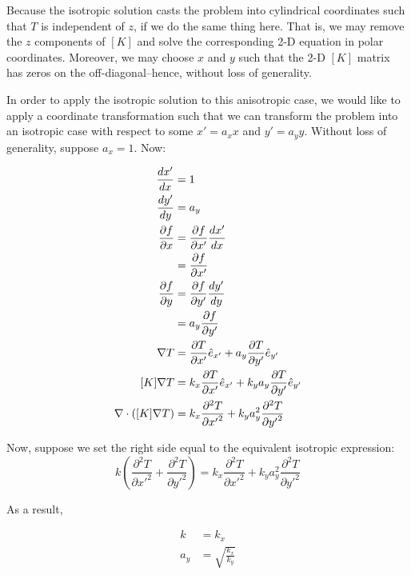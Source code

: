 \documentclass[10pt, letterpaper]{article}
\begin{document}
Because the isotropic solution casts the problem into cylindrical coordinates such that \(T\) is independent of \(z\), if we do the same thing here. That is, we may remove the \(z\) components of \([K]\) and solve the corresponding 2-D equation in polar coordinates. Moreover, we may choose \(x\) and \(y\) such that the 2-D \([K]\) matrix has zeros on the off-diagonal--hence, without loss of generality.

In order to apply the isotropic solution to this anisotropic case, we would like to apply a coordinate transformation such that we can transform the problem into an isotropic case with respect to some \(x' = a_x x\) and \(y' = a_y y\). Without loss of generality, suppose \(a_x = 1\). Now:

\begin{align*}
\frac{dx'}{dx} &= 1\\
\frac{dy'}{dy} &= a_y\\
\frac{\partial f}{\partial x} &= \frac{\partial f}{\partial x'}\frac{dx'}{dx}\\
    &= \frac{\partial f}{\partial x'}\\
\frac{\partial f}{\partial y} &= \frac{\partial f}{\partial y'}\frac{dy'}{dy}\\
    &= a_y\frac{\partial f}{\partial y'}\\
\nabla T &= \frac{\partial T}{\partial x'} \hat{e}_{x'} + a_y\frac{\partial T}{\partial y'} \hat{e}_{y'} \\
[K]\nabla T &= k_x\frac{\partial T}{\partial x'} \hat{e}_{x'} + k_ya_y\frac{\partial T}{\partial y'} \hat{e}_{y'}\\
\nabla \cdot \left([K]\nabla T\right) &= k_x\frac{\partial^2 T}{\partial {x'}^2} + k_ya_y^2\frac{\partial^2 T}{\partial {y'}^2}\\
\end{align*}

Now, suppose we set the right side equal to the equivalent isotropic expression:
\begin{equation*}
k\left(\frac{\partial^2 T}{\partial {x'}^2} + \frac{\partial^2 T}{\partial {y'}^2} \right) = k_x\frac{\partial^2 T}{\partial {x'}^2} + k_ya_y^2\frac{\partial^2 T}{\partial {y'}^2}
\end{equation*}

As a result,

\begin{align*}
k &= k_x\\ a_y &= \sqrt{\frac{k_x}{k_y}}\\
\end{align*}
\end{document}

